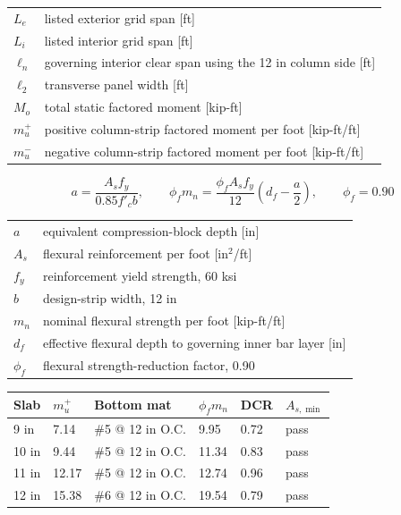 \documentclass[10pt]{article}
\begin{document}
{\ttfamily\footnotesize
\begin{tabular}{@{}ll@{}}
$L_e$ & listed exterior grid span [ft] \\
$L_i$ & listed interior grid span [ft] \\
$\ell_n$ & governing interior clear span using the 12 in column side [ft] \\
$\ell_2$ & transverse panel width [ft] \\
$M_o$ & total static factored moment [kip-ft] \\
$m_u^+$ & positive column-strip factored moment per foot [kip-ft/ft] \\
$m_u^-$ & negative column-strip factored moment per foot [kip-ft/ft] \\
\end{tabular}
}


\begin{equation}
a=\frac{A_s f_y}{0.85f'_c b},
\qquad
\phi_f m_n=\frac{\phi_f A_s f_y}{12}
\left(d_f-\frac{a}{2}\right),
\qquad
\phi_f=0.90
\end{equation}

{\ttfamily\footnotesize
\begin{tabular}{@{}ll@{}}
$a$ & equivalent compression-block depth [in] \\
$A_s$ & flexural reinforcement per foot [in$^2$/ft] \\
$f_y$ & reinforcement yield strength, 60 ksi \\
$b$ & design-strip width, 12 in \\
$m_n$ & nominal flexural strength per foot [kip-ft/ft] \\
$d_f$ & effective flexural depth to governing inner bar layer [in] \\
$\phi_f$ & flexural strength-reduction factor, 0.90 \\
\end{tabular}
}


{\ttfamily\footnotesize
\renewcommand{\arraystretch}{1.15}
\begin{tabular}{@{}p{0.55in}p{0.85in}p{1.20in}p{0.95in}p{0.70in}p{1.00in}@{}}
Slab & $m_u^+$ & Bottom mat & $\phi_fm_n$ & DCR & $A_{s,\min}$ \\
\hline
9 in  & 7.14 & \#5 @ 12 in O.C. & 9.95 & 0.72 & pass \\
10 in & 9.44 & \#5 @ 12 in O.C. & 11.34 & 0.83 & pass \\
11 in & 12.17 & \#5 @ 12 in O.C. & 12.74 & 0.96 & pass \\
12 in & 15.38 & \#6 @ 12 in O.C. & 19.54 & 0.79 & pass \\
\end{tabular}
}
\end{document}
